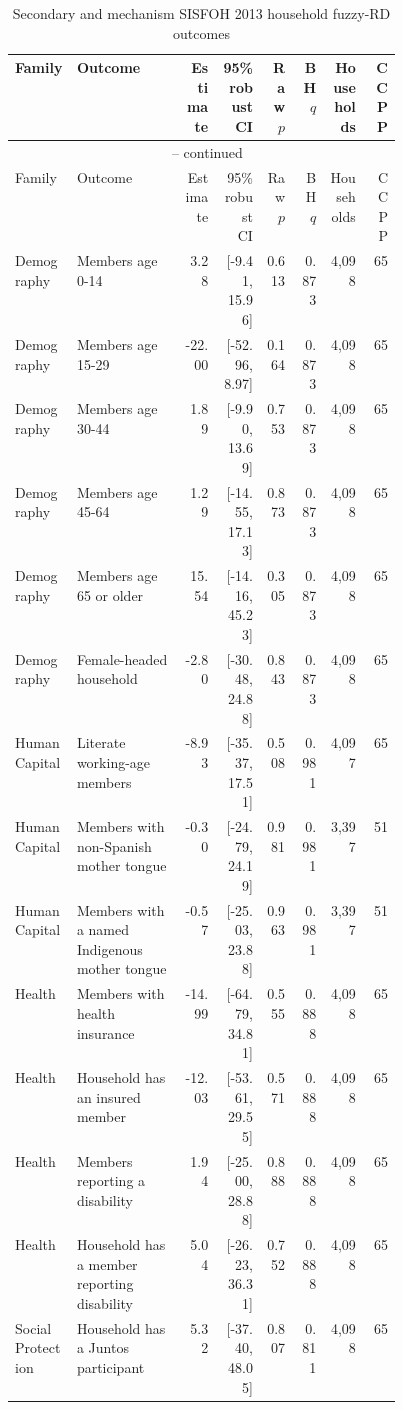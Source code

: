 \begingroup
\scriptsize
\begin{longtable}{p{0.16\linewidth}p{0.29\linewidth}rrrrrr}
\caption{Secondary and mechanism SISFOH 2013 household fuzzy-RD outcomes}
\label{tab:rd_outcomes_secondary_2013_household} \\
\toprule
Family & Outcome & Estimate & 95\% robust CI & Raw \(p\) & BH \(q\) & Households & CCPP \\
\midrule
\endfirsthead
\multicolumn{8}{c}{\tablename\ \thetable{} -- continued} \\
\toprule
Family & Outcome & Estimate & 95\% robust CI & Raw \(p\) & BH \(q\) & Households & CCPP \\
\midrule
\endhead
Demography & Members age 0-14 & 3.28 & [-9.41, 15.96] & 0.613 & 0.873 & 4,098 & 65 \\
Demography & Members age 15-29 & -22.00 & [-52.96, 8.97] & 0.164 & 0.873 & 4,098 & 65 \\
Demography & Members age 30-44 & 1.89 & [-9.90, 13.69] & 0.753 & 0.873 & 4,098 & 65 \\
Demography & Members age 45-64 & 1.29 & [-14.55, 17.13] & 0.873 & 0.873 & 4,098 & 65 \\
Demography & Members age 65 or older & 15.54 & [-14.16, 45.23] & 0.305 & 0.873 & 4,098 & 65 \\
Demography & Female-headed household & -2.80 & [-30.48, 24.88] & 0.843 & 0.873 & 4,098 & 65 \\
Human Capital & Literate working-age members & -8.93 & [-35.37, 17.51] & 0.508 & 0.981 & 4,097 & 65 \\
Human Capital & Members with non-Spanish mother tongue & -0.30 & [-24.79, 24.19] & 0.981 & 0.981 & 3,397 & 51 \\
Human Capital & Members with a named Indigenous mother tongue & -0.57 & [-25.03, 23.88] & 0.963 & 0.981 & 3,397 & 51 \\
Health & Members with health insurance & -14.99 & [-64.79, 34.81] & 0.555 & 0.888 & 4,098 & 65 \\
Health & Household has an insured member & -12.03 & [-53.61, 29.55] & 0.571 & 0.888 & 4,098 & 65 \\
Health & Members reporting a disability & 1.94 & [-25.00, 28.88] & 0.888 & 0.888 & 4,098 & 65 \\
Health & Household has a member reporting disability & 5.04 & [-26.23, 36.31] & 0.752 & 0.888 & 4,098 & 65 \\
Social Protection & Household has a Juntos participant & 5.32 & [-37.40, 48.05] & 0.807 & 0.811 & 4,098 & 65 \\

\end{longtable}
